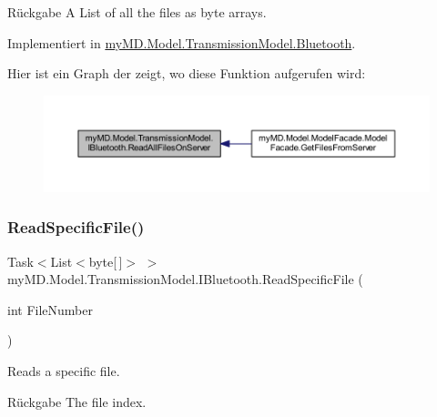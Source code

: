 \begin{DoxyReturn}{Rückgabe}
A List of all the files as byte arrays.
\end{DoxyReturn}


Implementiert in \mbox{\hyperlink{classmy_m_d_1_1_model_1_1_transmission_model_1_1_bluetooth_afe39e1c7625dceedf9b5266eb731b4f9}{my\+M\+D.\+Model.\+Transmission\+Model.\+Bluetooth}}.

Hier ist ein Graph der zeigt, wo diese Funktion aufgerufen wird\+:
\nopagebreak
\begin{figure}[H]
\begin{center}
\leavevmode
\includegraphics[width=350pt]{interfacemy_m_d_1_1_model_1_1_transmission_model_1_1_i_bluetooth_a1a929cee5eff377bd3a2c51fa802e597_icgraph}
\end{center}
\end{figure}
\mbox{\label{interfacemy_m_d_1_1_model_1_1_transmission_model_1_1_i_bluetooth_ad1db5899a69c45439ad3aca8c7410c9e}} 
\subsubsection{\texorpdfstring{Read\+Specific\+File()}{ReadSpecificFile()}}
{\footnotesize\ttfamily Task$<$List$<$byte\mbox{[}$\,$\mbox{]}$>$ $>$ my\+M\+D.\+Model.\+Transmission\+Model.\+I\+Bluetooth.\+Read\+Specific\+File (\begin{DoxyParamCaption}\item[{int}]{File\+Number }\end{DoxyParamCaption})}



Reads a specific file. 

\begin{DoxyReturn}{Rückgabe}
The file index.
\end{DoxyReturn}

